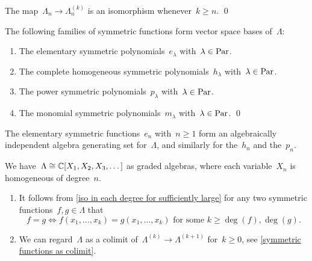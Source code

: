 \documentclass[a4paper,11pt]{scrartcl}
\begin{document}
\begin{corollary}
  \label{iso in each degree for sufficiently large}
  The map~$\Lambda_n \to \Lambda^{(k)}_n$ is an isomorphism whenever~$k \geq n$.
  \qed
\end{corollary}

\begin{corollary}
  The following families of symmetric functions form vector space bases of~$\Lambda$:
  \begin{enumerate}
    \item
      The elementary symmetric polynomials~$e_\lambda$ with~$\lambda \in \mathrm{Par}$.
    \item
      The complete homogeneous symmetric polynomials~$h_\lambda$ with~$\lambda \in \mathrm{Par}$.
    \item
      The power symmetric polynomials~$p_\lambda$ with~$\lambda \in \mathrm{Par}$.
    \item
      The monomial symmetric polynomials~$m_\lambda$ with~$\lambda \in \mathrm{Par}$.
    \qed
  \end{enumerate}
\end{corollary}

\begin{corollary}
  The elementary symmetric functions~$e_n$ with~$n \geq 1$ form an algebraically independent algebra generating set for~$\Lambda$, and similarly for the~$h_n$ and the~$p_n$.
\end{corollary}

\begin{corollary}
  We have~$\Lambda \cong \mathbb{C}[X_1, X_2, X_3, \dotsc]$ as graded algebras, where each variable~$X_n$ is homogeneous of degree~$n$.
\end{corollary}

\begin{remark}
  \leavevmode
  \begin{enumerate}
    \item
      It follows from \cref{iso in each degree for sufficiently large} for any two symmetric functions~$f, g \in \Lambda$ that
      \[
        f = g
        \iff
        \text{$f(x_1, \dotsc, x_k) = g(x_1, \dotsc, x_k)$ for some~$k \geq \deg(f), \deg(g)$.}
      \]
    \item
      We can regard~$\Lambda$ as a colimit of~$\Lambda^{(k)} \to \Lambda^{(k+1)}$ for~$k \geq 0$, see \cref{symmetric functions as colimit}.
  \end{enumerate}
\end{remark}
\end{document}
